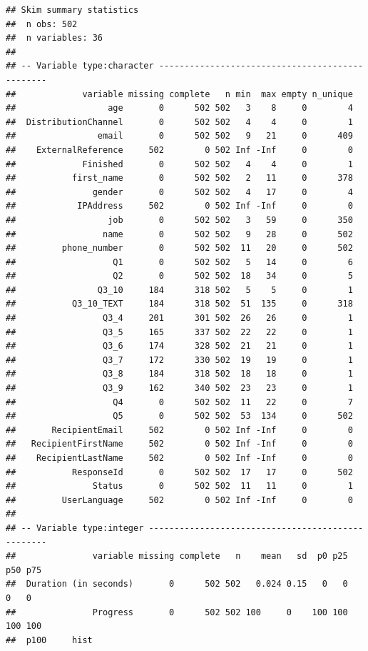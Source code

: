 \documentclass[]{book}
\begin{document}
\begin{verbatim}
## Skim summary statistics
##  n obs: 502 
##  n variables: 36 
## 
## -- Variable type:character ------------------------------------------------
##             variable missing complete   n min  max empty n_unique
##                  age       0      502 502   3    8     0        4
##  DistributionChannel       0      502 502   4    4     0        1
##                email       0      502 502   9   21     0      409
##    ExternalReference     502        0 502 Inf -Inf     0        0
##             Finished       0      502 502   4    4     0        1
##           first_name       0      502 502   2   11     0      378
##               gender       0      502 502   4   17     0        4
##            IPAddress     502        0 502 Inf -Inf     0        0
##                  job       0      502 502   3   59     0      350
##                 name       0      502 502   9   28     0      502
##         phone_number       0      502 502  11   20     0      502
##                   Q1       0      502 502   5   14     0        6
##                   Q2       0      502 502  18   34     0        5
##                Q3_10     184      318 502   5    5     0        1
##           Q3_10_TEXT     184      318 502  51  135     0      318
##                 Q3_4     201      301 502  26   26     0        1
##                 Q3_5     165      337 502  22   22     0        1
##                 Q3_6     174      328 502  21   21     0        1
##                 Q3_7     172      330 502  19   19     0        1
##                 Q3_8     184      318 502  18   18     0        1
##                 Q3_9     162      340 502  23   23     0        1
##                   Q4       0      502 502  11   22     0        7
##                   Q5       0      502 502  53  134     0      502
##       RecipientEmail     502        0 502 Inf -Inf     0        0
##   RecipientFirstName     502        0 502 Inf -Inf     0        0
##    RecipientLastName     502        0 502 Inf -Inf     0        0
##           ResponseId       0      502 502  17   17     0      502
##               Status       0      502 502  11   11     0        1
##         UserLanguage     502        0 502 Inf -Inf     0        0
## 
## -- Variable type:integer --------------------------------------------------
##               variable missing complete   n    mean   sd  p0 p25 p50 p75
##  Duration (in seconds)       0      502 502   0.024 0.15   0   0   0   0
##               Progress       0      502 502 100     0    100 100 100 100
##  p100     hist

\end{verbatim}
\end{document}
